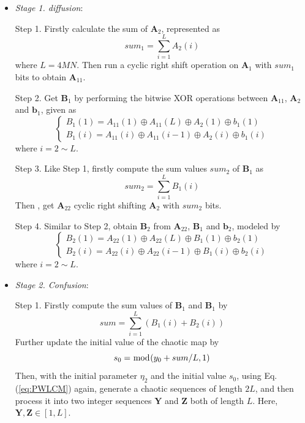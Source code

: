 \documentclass[final,3p,times,twocolumn]{elsarticle}
\begin{document}
\begin{itemize}
	
	\item \emph{Stage 1. diffusion}:
	
	Step 1. Firstly calculate the sum of $\bm{A}_2$, represented as
	\begin{equation}
	sum_1 = \sum\limits_{i= 1}^{L} A_2(i)
	\label{eq:sum1}
	\end{equation}
	where $L=4MN$. Then run a cyclic right shift operation on $\bm{A}_1$ with $sum_1$ bits to obtain $\bm{A}_{11}$.
	
	Step 2. Get $\bm{B}_{1}$ by performing the bitwise XOR operations between $\bm{A}_{11}$, $\bm{A}_{2}$ and $\bm{b}_{1}$, given as
	\begin{equation}
	\left\{ \begin{array}{l}
	B_1(1) = A_{11}(1) \oplus A_{11}(L) \oplus A_{2}(1) \oplus b_{1}(1)\\
	B_1(i) = A_{11}(i) \oplus A_{11}(i-1) \oplus A_{2}(i) \oplus b_{1}(i)
	\end{array} \right.
	\label{eq:B1_diffusion}
	\end{equation}
	where $i=2 \sim L$.
	
	Step 3. Like Step 1, firstly compute the sum values $sum_2$ of $\bm{B}_1$ as
	\begin{equation}
	sum_2 = \sum\limits_{i= 1}^{L} B_1(i)
	\label{eq:sum2}
	\end{equation}
	Then , get $\bm{A}_{22}$ cyclic right shifting $\bm{A}_2$ with $sum_2$ bits.
	
	Step 4. Similar to Step 2, obtain $\bm{B}_{2}$ from $\bm{A}_{22}$, $\bm{B}_{1}$ and $\bm{b}_{2}$, modeled by
	\begin{equation}
	\left\{ \begin{array}{l}
	B_2(1) = A_{22}(1) \oplus A_{22}(L) \oplus B_{1}(1) \oplus b_{2}(1)\\
	B_2(i) = A_{22}(i) \oplus A_{22}(i-1) \oplus B_{1}(i) \oplus b_{2}(i)
	\end{array} \right.
	\label{eq:B2_diffusion}
	\end{equation}
	where $i=2 \sim L$.
	
	\item \emph{Stage 2. Confusion}:
	
	Step 1. Firstly compute the sum values of $\bm{B}_1$ and $\bm{B}_1$ by
	\begin{equation}
	sum = \sum\limits_{i= 1}^{L} (B_1(i)+B_2(i))
	\label{eq:sum3}
	\end{equation}
	Further update the initial value of the chaotic map by
	\begin{equation}
	s_0 = \bmod(y_0+sum/L,1)\\
	\label{eq:update_y0}
	\end{equation}
	Then, with the initial parameter $\eta_2$ and the initial value $s_0$,  using Eq. (\ref{eq:PWLCM}) again, generate a chaotic sequences of length $2L$, and then process it into two integer sequences $\bm{Y}$ and $\bm{Z}$ both of length $L$. Here, $\bm{Y},\bm{Z} \in [1,L]$.
	

\end{itemize}
\end{document}
